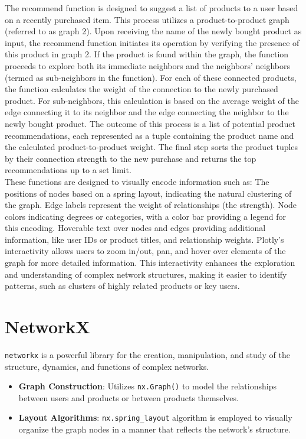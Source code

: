 \documentclass[fontsize=11pt]{article}
\begin{document}
The recommend function is designed to suggest a list of products to a user based on a recently purchased item. This process utilizes a product-to-product graph (referred to as graph 2). Upon receiving the name of the newly bought product as input, the recommend function initiates its operation by verifying the presence of this product in graph 2. If the product is found within the graph, the function proceeds to explore both its immediate neighbors and the neighbors' neighbors (termed as sub-neighbors in the function). For each of these connected products, the function calculates the weight of the connection to the newly purchased product. For sub-neighbors, this calculation is based on the average weight of the edge connecting it to its neighbor and the edge connecting the neighbor to the newly bought product. The outcome of this process is a list of potential product recommendations, each represented as a tuple containing the product name and the calculated product-to-product weight. The final step sorts the product tuples by their connection strength to the new purchase and returns the top recommendations up to a set limit.\\


These functions are designed to visually encode information such as:
The positions of nodes based on a spring layout, indicating the natural clustering of the graph.
Edge labels represent the weight of relationships (the strength).
Node colors indicating degrees or categories, with a color bar providing a legend for this encoding.
Hoverable text over nodes and edges providing additional information, like user IDs or product titles, and relationship weights. Plotly's interactivity allows users to zoom in/out, pan, and hover over elements of the graph for more detailed information. This interactivity enhances the exploration and understanding of complex network structures, making it easier to identify patterns, such as clusters of highly related products or key users.

\section*{NetworkX}

\texttt{networkx} is a powerful library for the creation, manipulation, and study of the structure, dynamics, and functions of complex networks.

\begin{itemize}
    \item \textbf{Graph Construction}: Utilizes \texttt{nx.Graph()} to model the relationships between users and products or between products themselves.
    \item \textbf{Layout Algorithms}: \texttt{nx.spring\_layout} algorithm is employed to visually organize the graph nodes in a manner that reflects the network's structure.
\end{itemize}
\end{document}
